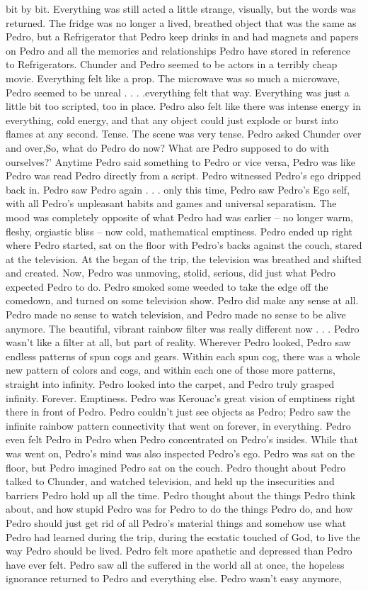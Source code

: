 \documentclass[12pt]{book}
\begin{document}
bit by bit. Everything was still acted a little strange, visually, but the words was returned. The fridge was no longer a lived, breathed object that was the same as Pedro, but a Refrigerator that Pedro keep drinks in and had magnets and papers on Pedro and all the memories and relationships Pedro have stored in reference to Refrigerators. Chunder and Pedro seemed to be actors in a terribly cheap movie. Everything felt like a prop. The microwave was so much a microwave, Pedro seemed to be unreal . . .  .everything felt that way. Everything was just a little bit too scripted, too in place. Pedro also felt like there was intense energy in everything, cold energy, and that any object could just explode or burst into flames at any second. Tense. The scene was very tense. Pedro asked Chunder over and over,So, what do Pedro do now? What are Pedro supposed to do with ourselves?' Anytime Pedro said something to Pedro or vice versa, Pedro was like Pedro was read Pedro directly from a script. Pedro witnessed Pedro's ego dripped back in. Pedro saw Pedro again . . .  only this time, Pedro saw Pedro's Ego self, with all Pedro's unpleasant habits and games and universal separatism. The mood was completely opposite of what Pedro had was earlier -- no longer warm, fleshy, orgiastic bliss -- now cold, mathematical emptiness. Pedro ended up right where Pedro started, sat on the floor with Pedro's backs against the couch, stared at the television. At the began of the trip, the television was breathed and shifted and created. Now, Pedro was unmoving, stolid, serious, did just what Pedro expected Pedro to do. Pedro smoked some weeded to take the edge off the comedown, and turned on some television show. Pedro did make any sense at all. Pedro made no sense to watch television, and Pedro made no sense to be alive anymore. The beautiful, vibrant rainbow filter was really different now . . .  Pedro wasn't like a filter at all, but part of reality. Wherever Pedro looked, Pedro saw endless patterns of spun cogs and gears. Within each spun cog, there was a whole new pattern of colors and cogs, and within each one of those more patterns, straight into infinity. Pedro looked into the carpet, and Pedro truly grasped infinity. Forever. Emptiness. Pedro was Kerouac's great vision of emptiness right there in front of Pedro. Pedro couldn't just see objects as Pedro; Pedro saw the infinite rainbow pattern connectivity that went on forever, in everything. Pedro even felt Pedro in Pedro when Pedro concentrated on Pedro's insides. While that was went on, Pedro's mind was also inspected Pedro's ego. Pedro was sat on the floor, but Pedro imagined Pedro sat on the couch. Pedro thought about Pedro talked to Chunder, and watched television, and held up the insecurities and barriers Pedro hold up all the time. Pedro thought about the things Pedro think about, and how stupid Pedro was for Pedro to do the things Pedro do, and how Pedro should just get rid of all Pedro's material things and somehow use what Pedro had learned during the trip, during the ecstatic touched of God, to live the way Pedro should be lived. Pedro felt more apathetic and depressed than Pedro have ever felt. Pedro saw all the suffered in the world all at once, the hopeless ignorance returned to Pedro and everything else. Pedro wasn't easy anymore, 
\end{document}
